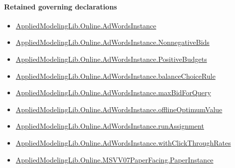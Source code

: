 \documentclass[10pt]{article}
\begin{document}
\paragraph{Retained governing declarations}
\begin{itemize}\raggedright
\item \hyperlink{governing-declaration-e5ce49672bf26ab1}{Applied\allowbreak{}Modeling\allowbreak{}Lib.\allowbreak{}Online.\allowbreak{}Ad\allowbreak{}Words\allowbreak{}Instance}
\item \hyperlink{governing-declaration-7bed8c5ff5e5cde7}{Applied\allowbreak{}Modeling\allowbreak{}Lib.\allowbreak{}Online.\allowbreak{}Ad\allowbreak{}Words\allowbreak{}Instance.\allowbreak{}Nonnegative\allowbreak{}Bids}
\item \hyperlink{governing-declaration-eabdcef9dca00922}{Applied\allowbreak{}Modeling\allowbreak{}Lib.\allowbreak{}Online.\allowbreak{}Ad\allowbreak{}Words\allowbreak{}Instance.\allowbreak{}Positive\allowbreak{}Budgets}
\item \hyperlink{governing-declaration-47ab5f144ca5a666}{Applied\allowbreak{}Modeling\allowbreak{}Lib.\allowbreak{}Online.\allowbreak{}Ad\allowbreak{}Words\allowbreak{}Instance.\allowbreak{}balance\allowbreak{}Choice\allowbreak{}Rule}
\item \hyperlink{governing-declaration-af1b7d959c110360}{Applied\allowbreak{}Modeling\allowbreak{}Lib.\allowbreak{}Online.\allowbreak{}Ad\allowbreak{}Words\allowbreak{}Instance.\allowbreak{}max\allowbreak{}Bid\allowbreak{}For\allowbreak{}Query}
\item \hyperlink{governing-declaration-421b6f6fda18a867}{Applied\allowbreak{}Modeling\allowbreak{}Lib.\allowbreak{}Online.\allowbreak{}Ad\allowbreak{}Words\allowbreak{}Instance.\allowbreak{}offline\allowbreak{}Optimum\allowbreak{}Value}
\item \hyperlink{governing-declaration-1878a8a2b3e3182d}{Applied\allowbreak{}Modeling\allowbreak{}Lib.\allowbreak{}Online.\allowbreak{}Ad\allowbreak{}Words\allowbreak{}Instance.\allowbreak{}run\allowbreak{}Assignment}
\item \hyperlink{governing-declaration-6cf0d8e5f275eabb}{Applied\allowbreak{}Modeling\allowbreak{}Lib.\allowbreak{}Online.\allowbreak{}Ad\allowbreak{}Words\allowbreak{}Instance.\allowbreak{}with\allowbreak{}Click\allowbreak{}Through\allowbreak{}Rates}
\item \hyperlink{governing-declaration-11907576ec71eeb5}{Applied\allowbreak{}Modeling\allowbreak{}Lib.\allowbreak{}Online.\allowbreak{}MSVV07\allowbreak{}Paper\allowbreak{}Facing.\allowbreak{}Paper\allowbreak{}Instance}

\end{itemize}
\end{document}
